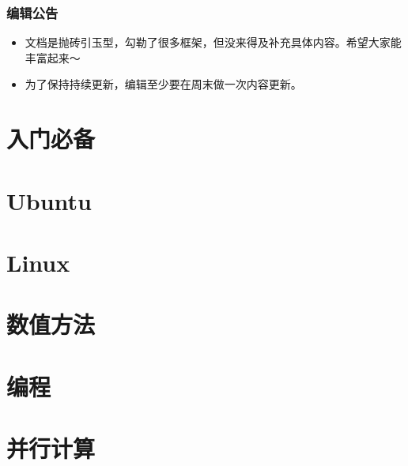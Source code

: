 \documentclass[cn,11pt,chinese,twoside]{elegantbook}
\begin{document}
\section*{编辑公告}
\begin{itemize}
\item 文档是抛砖引玉型，勾勒了很多框架，但没来得及补充具体内容。希望大家能丰富起来～
\item 为了保持持续更新，编辑至少要在周末做一次内容更新。
\end{itemize}





\part{入门必备}


\part{Ubuntu}


\part{Linux}






\part{数值方法}


\part{编程}



\part{并行计算}

\end{document}
